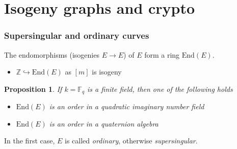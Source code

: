 \documentclass{beamer}
\newcommand{\Z}{\mathbb{Z}}
\newcommand{\F}{\mathbb{F}}
\newcommand{\End}{\mathrm{End}}
\newtheorem{proposition}{Proposition}
\begin{document}
\section{Isogeny graphs and crypto}

\begin{frame}
    \frametitle{Supersingular and ordinary curves}
    The endomorphisms (isogenies $E \to E$) of $E$ form a ring $\End(E)$.
    \begin{itemize}
        \item $\Z \hookrightarrow \End(E)$ as $[m]$ is isogeny
    \end{itemize}
    \pause
    \begin{proposition}
        If $k = \F_q$ is a finite field, then one of the following holds
        \begin{itemize}
            \item $\End(E)$ is an order in a quadratic imaginary number field
            \item $\End(E)$ is an order in a quaternion algebra
        \end{itemize}
    \end{proposition}
    \pause
    \begin{definition}
        In the first case, $E$ is called \emph{ordinary}, otherwise \emph{supersingular}.
    \end{definition}
\end{frame}
\end{document}
